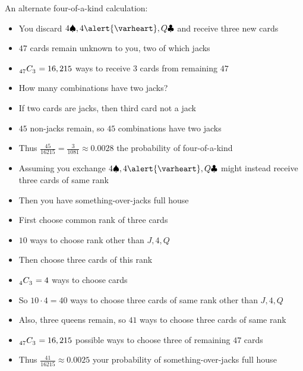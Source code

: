\documentclass[xcolor=dvipsnames]{beamer}
\theoremstyle{definition}
\newcommand\ncr[2]{\tensor[_{#1}]C{_{#2}}}
\newcommand{\hs}{\alert{\varheart}}
\newcommand{\s}{\spadesuit}
\newcommand{\cs}{\clubsuit}
\begin{document}
\begin{frame}
An alternate four-of-a-kind calculation:
\begin{itemize}
\item You discard $4\s,4\hs,Q\cs$ and receive three new cards
\item $47$ cards remain unknown to you, two of which jacks
\item $\ncr{47}{3}=16,215$ ways to receive $3$ cards from remaining $47$
\item How many combinations have two jacks?
\item If two cards are jacks, then third card not a jack
\item $45$ non-jacks remain, so $45$ combinations
have two jacks
\item Thus $\frac{45}{16215}=\frac{3}{1081}\approx 0.0028$
the probability of four-of-a-kind
\end{itemize}
\end{frame}

\begin{frame}
\begin{itemize}
\item Assuming you exchange $4\s,4\hs,Q\cs$
might instead receive three cards of same rank
\item Then you have \alert{something-over-jacks full house}
\item First choose common rank of three cards
\item $10$ ways to choose rank other than $J,4,Q$
\item Then choose three cards of this rank
\item $\ncr{4}{3}=4$ ways to choose cards
\item So $10\cdot 4=40$ ways to choose three cards of
same rank other than $J,4,Q$
\item Also, three queens remain, so $41$ ways
to choose three cards of same rank
\item $\ncr{47}{3}=16,215$ possible ways to
choose three of remaining $47$ cards
\item Thus $\frac{41}{16215}\approx 0.0025$
your probability of something-over-jacks full house
\end{itemize}
\end{frame}
\end{document}
